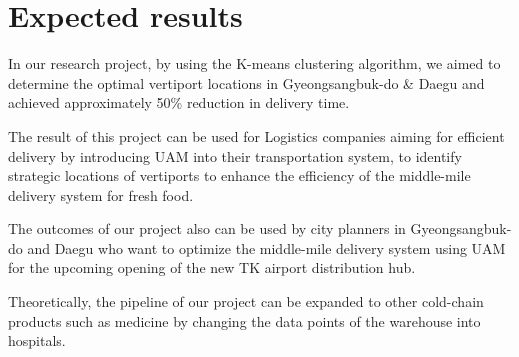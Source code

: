 \documentclass[11pt]{article}
\begin{document}
    \section{Expected results}   

    In our research project, by using the K-means clustering algorithm, we aimed to determine the optimal vertiport locations in Gyeongsangbuk-do \& Daegu and achieved approximately 50\% reduction in delivery time.
    
    The result of this project can be used for Logistics companies aiming for efficient delivery by introducing UAM into their transportation system, to identify strategic locations of vertiports to enhance the efficiency of the middle-mile delivery system for fresh food.
    
    The outcomes of our project also can be used by city planners in Gyeongsangbuk-do and Daegu who want to optimize the middle-mile delivery system using UAM for the upcoming opening of the new TK airport distribution hub.

    Theoretically, the pipeline of our project can be expanded to other cold-chain products such as medicine by changing the data points of the warehouse into hospitals.\\   
    
    
\end{document}
